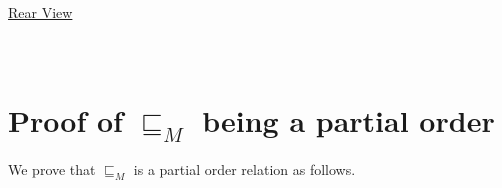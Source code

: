 \documentclass[final,3p, review, times]{util/elsarticle}
\begin{document}
\\\\\\\\\\\\\\\\\\\\\\\\\\\\\\\\\\
\centerline{\underline{\Large{Rear View}}}







\section{\\Proof of $\sqsubseteq_M$ being a partial order}
\label{app:interval_partial}

We prove that $\sqsubseteq_M$ is a partial order relation as follows.
\end{document}
